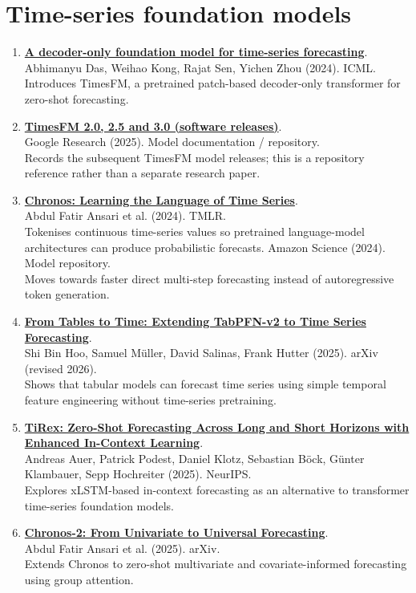 \documentclass[9pt,a4paper]{extarticle}
\begin{document}
\section{Time-series foundation models}
\begin{enumerate}[resume]
\item \textbf{\href{https://arxiv.org/abs/2310.10688}{A decoder-only foundation model for time-series forecasting}}.\\
Abhimanyu Das, Weihao Kong, Rajat Sen, Yichen Zhou (2024). ICML.\\
 Introduces TimesFM, a pretrained patch-based decoder-only transformer for zero-shot forecasting.
\item \textbf{\href{https://github.com/google-research/timesfm}{TimesFM 2.0, 2.5 and 3.0 (software releases)}}.\\
Google Research (2025). Model documentation / repository.\\
 Records the subsequent TimesFM model releases; this is a repository reference rather than a separate research paper.
\item \textbf{\href{https://arxiv.org/abs/2403.07815}{Chronos: Learning the Language of Time Series}}.\\
Abdul Fatir Ansari et al. (2024). TMLR.\\
 Tokenises continuous time-series values so pretrained language-model architectures can produce probabilistic forecasts.
Amazon Science (2024). Model repository.\\
 Moves towards faster direct multi-step forecasting instead of autoregressive token generation.
\item \textbf{\href{https://arxiv.org/abs/2501.02945}{From Tables to Time: Extending TabPFN-v2 to Time Series Forecasting}}.\\
Shi Bin Hoo, Samuel M\"uller, David Salinas, Frank Hutter (2025). arXiv (revised 2026).\\
 Shows that tabular models can forecast time series using simple temporal feature engineering without time-series pretraining.
\item \textbf{\href{https://arxiv.org/abs/2505.23719}{TiRex: Zero-Shot Forecasting Across Long and Short Horizons with Enhanced In-Context Learning}}.\\
Andreas Auer, Patrick Podest, Daniel Klotz, Sebastian B\"ock, G\"unter Klambauer, Sepp Hochreiter (2025). NeurIPS.\\
 Explores xLSTM-based in-context forecasting as an alternative to transformer time-series foundation models.
\item \textbf{\href{https://arxiv.org/abs/2510.15821}{Chronos-2: From Univariate to Universal Forecasting}}.\\
Abdul Fatir Ansari et al. (2025). arXiv.\\
 Extends Chronos to zero-shot multivariate and covariate-informed forecasting using group attention.
\end{enumerate}
\end{document}
